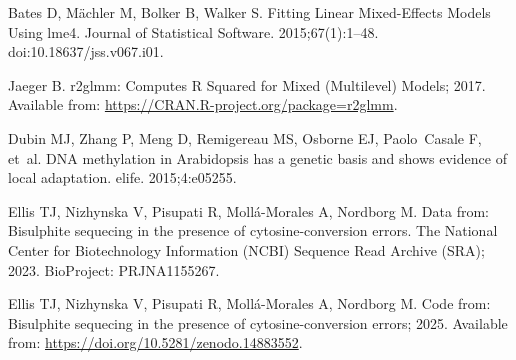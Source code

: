 \documentclass[10pt,draft,letterpaper]{article}
\begin{document}
\begin{thebibliography}{10}
Bates D, M{\"a}chler M, Bolker B, Walker S.
\newblock Fitting Linear Mixed-Effects Models Using {lme4}.
\newblock Journal of Statistical Software. 2015;67(1):1--48.
\newblock doi:{10.18637/jss.v067.i01}.

Jaeger B. r2glmm: Computes R Squared for Mixed (Multilevel) Models; 2017.
\newblock Available from: \url{https://CRAN.R-project.org/package=r2glmm}.

Dubin MJ, Zhang P, Meng D, Remigereau MS, Osborne EJ, Paolo~Casale F, et~al.
\newblock DNA methylation in Arabidopsis has a genetic basis and shows evidence of local adaptation.
\newblock elife. 2015;4:e05255.

Ellis TJ, Nizhynska V, Pisupati R, Moll\'a-Morales A, Nordborg M.
\newblock Data from: Bisulphite sequecing in the presence of cytosine-conversion errors.
\newblock The National Center for Biotechnology Information (NCBI) Sequence Read Archive (SRA); 2023. BioProject: PRJNA1155267.

Ellis TJ, Nizhynska V, Pisupati R, Moll\'a-Morales A, Nordborg M. Code from: Bisulphite sequecing in the presence of cytosine-conversion errors; 2025.
\newblock Available from: \url{https://doi.org/10.5281/zenodo.14883552}.

\end{thebibliography}
\end{document}
